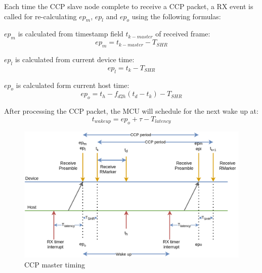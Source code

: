 \documentclass[\main/main.tex]{subfiles}
\begin{document}
Each time the CCP slave node complete to receive a CCP packet, a RX event is called for re-calculating $ep_m$, $ep_l$ and $ep_o$ using the following formulas:

$ep_m$ is calculated from timestamp field $t_{k-master}$ of received frame:
\begin{equation}
    ep_m = t_{k-master} - T_{SHR}
\end{equation}

$ep_l$ is calculated from current device time:
\begin{equation}
ep_l = t_k - T_{SHR}
\end{equation}

$ep_o$ is calculated form current host time:
\begin{equation}
    ep_o = t_h - f_{d2h}(t_d - t_k) - T_{SHR}
\end{equation}

After processing the CCP packet, the MCU will schedule for the next wake up at:
\begin{equation}
    t_{wake up} = ep_o + \tau - T_{latency}
\end{equation}

\begin{figure}[H]
    \begin{center}
        \includegraphics[scale=0.35]{ccp_timing_for_slave_node.png}
    \end{center}
    \caption{CCP master timing}
    \label{fig:ccp_timing_for_slave_node}
\end{figure}
\end{document}
